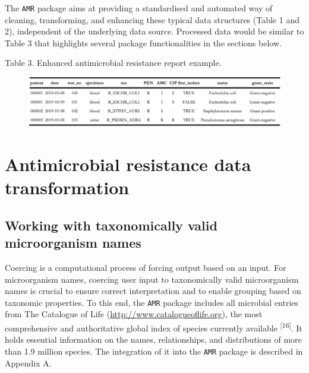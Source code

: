 \documentclass[
]{book}
\begin{document}
The \texttt{AMR} package aims at providing a standardised and automated way of cleaning, transforming, and enhancing these typical data structures (Table 1 and 2), independent of the underlying data source. Processed data would be similar to Table 3 that highlights several package functionalities in the sections below.

Table 3. Enhanced antimicrobial resistance report example.

\begin{figure}

{\centering \includegraphics[width=1\linewidth]{images/04-t03} 

}

\end{figure}

\hypertarget{antimicrobial-resistance-data-transformation}{%
\section{Antimicrobial resistance data transformation}\label{antimicrobial-resistance-data-transformation}}

\hypertarget{working-with-taxonomically-valid-microorganism-names}{%
\subsection{Working with taxonomically valid microorganism names}\label{working-with-taxonomically-valid-microorganism-names}}

Coercing is a computational process of forcing output based on an input. For microorganism names, coercing user input to taxonomically valid microorganism names is crucial to ensure correct interpretation and to enable grouping based on taxonomic properties. To this end, the \texttt{AMR} package includes all microbial entries from The Catalogue of Life (\url{http://www.catalogueoflife.org}), the most comprehensive and authoritative global index of species currently available \textsuperscript{{[}16{]}}. It holds essential information on the names, relationships, and distributions of more than 1.9 million species. The integration of it into the \texttt{AMR} package is described in Appendix A.
\end{document}
